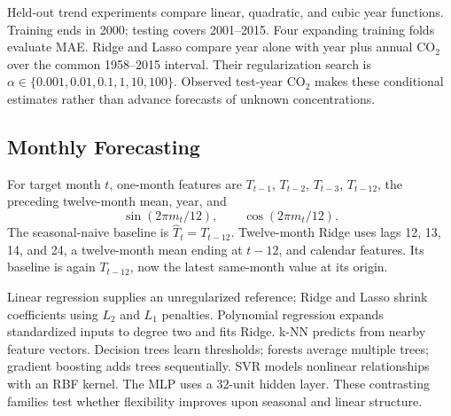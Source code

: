 \documentclass[conference]{IEEEtran}
\begin{document}
Held-out trend experiments compare linear, quadratic, and cubic year functions. Training ends in 2000; testing covers 2001--2015. Four expanding training folds evaluate MAE. Ridge and Lasso compare year alone with year plus annual CO$_2$ over the common 1958--2015 interval. Their regularization search is $\alpha\in\{0.001,0.01,0.1,1,10,100\}$. Observed test-year CO$_2$ makes these conditional estimates rather than advance forecasts of unknown concentrations.

\subsection{Monthly Forecasting}
For target month $t$, one-month features are $T_{t-1}$, $T_{t-2}$, $T_{t-3}$, $T_{t-12}$, the preceding twelve-month mean, year, and
\begin{equation}\sin(2\pi m_t/12),\qquad\cos(2\pi m_t/12).\end{equation}
The seasonal-naive baseline is $\hat T_t=T_{t-12}$. Twelve-month Ridge uses lags 12, 13, 14, and 24, a twelve-month mean ending at $t-12$, and calendar features. Its baseline is again $T_{t-12}$, now the latest same-month value at its origin.

Linear regression supplies an unregularized reference; Ridge and Lasso shrink coefficients using $L_2$ and $L_1$ penalties. Polynomial regression expands standardized inputs to degree two and fits Ridge. k-NN predicts from nearby feature vectors. Decision trees learn thresholds; forests average multiple trees; gradient boosting adds trees sequentially. SVR models nonlinear relationships with an RBF kernel. The MLP uses a 32-unit hidden layer. These contrasting families test whether flexibility improves upon seasonal and linear structure.
\end{document}
